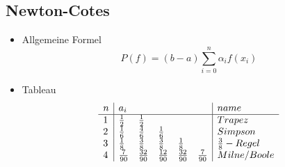 \subsection{Newton-Cotes}
\begin{itemize}

	\item Allgemeine Formel \\
	\begin{equation*}
		P(f) = (b-a) \sum_{i=0}^n \alpha_i f(x_i)
	\end{equation*}
	
	\item Tableau \\
	\begin{displaymath}
		\begin{array}{l | lllll | l}
			n & a_i & & & & & name \\
			\hline
			1 & \frac{1}{2} & \frac{1}{2} & & & & Trapez \\
			2 & \frac{1}{6} & \frac{4}{6} & \frac{1}{6} & & & Simpson \\
			3 & \frac{1}{8} & \frac{3}{8} & \frac{3}{8} & \frac{1}{8} & & \frac{3}{8}-Regel \\
			4 & \frac{7}{90} & \frac{32}{90} & \frac{12}{90} & \frac{32}{90} & \frac{7}{90} & Milne/Boole \\
		\end{array}
	\end{displaymath}
	
\end{itemize}

